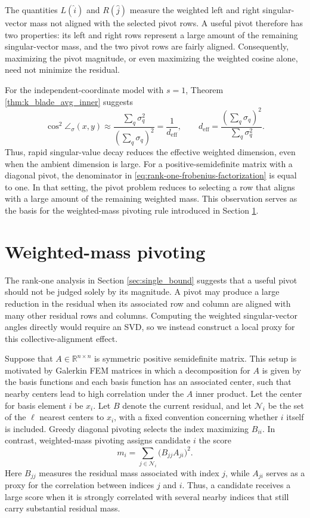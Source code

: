 \documentclass[11pt, preprint]{article}
\newcommand{\R}{\mathbb{R}}
\begin{document}
The quantities $L(\widehat i)$ and $R(\widehat j)$ measure the weighted
left and right singular-vector mass not aligned with the selected pivot
rows. A useful pivot therefore has two properties: its left and right rows
represent a large amount of the remaining singular-vector mass, and the two
pivot rows are fairly aligned. Consequently, maximizing
the pivot magnitude, or even maximizing the weighted cosine alone, need not
minimize the residual.

For the independent-coordinate model with $s=1$, Theorem
\ref{thm:k_blade_avg_inner} suggests
\[
\cos^2\angle_\sigma(x,y)
\approx
\frac{\sum_q\sigma_q^2}{\left(\sum_q\sigma_q\right)^2}
=
\frac{1}{d_{\mathrm{eff}}},
\qquad
d_{\mathrm{eff}}
=
\frac{\left(\sum_q\sigma_q\right)^2}{\sum_q\sigma_q^2}.
\]
Thus, rapid singular-value decay reduces the effective weighted dimension,
even when the ambient dimension is large. For a positive-semidefinite matrix
with a diagonal pivot, the denominator in
\eqref{eq:rank-one-frobenius-factorization} is equal to one. In that setting,
the pivot problem reduces to selecting a row that aligns with a large amount
of the remaining weighted mass. This observation serves as the basis for the 
weighted-mass pivoting rule introduced in Section
\ref{sec:weighted_mass_pivot}.


\section{Weighted-mass pivoting}\label{sec:weighted_mass_pivot}

The rank-one analysis in Section \ref{sec:single_bound} suggests that a useful
pivot should not be judged solely by its magnitude. A pivot may produce a
large reduction in the residual when its associated row and column are aligned
with many other residual rows and columns. Computing the weighted
singular-vector angles directly would require an SVD, so we instead construct
a local proxy for this collective-alignment effect.

Suppose that $A\in\R^{n\times n}$ is symmetric positive semidefinite matrix. This setup is motivated by Galerkin FEM matrices in which a decomposition for $A$ is given by the basis functions and each basis function has an associated center, such that nearby centers lead to high correlation under the $A$ inner product. Let the center for basis element $i$ be $x_i$. Let $B$ denote the
current residual, and let $\mathcal N_i$ be the set of the $\ell$ nearest centers
to $x_i$, with a fixed convention concerning whether $i$ itself is included.
Greedy diagonal pivoting selects the index maximizing $B_{ii}$. In contrast,
weighted-mass pivoting assigns candidate $i$ the score
\begin{equation}\label{eq:weighted-mass-score}
    m_i
    =
    \sum_{j\in\mathcal N_i}
    \bigl(B_{jj}A_{ji}\bigr)^2.
\end{equation}
Here $B_{jj}$ measures the residual mass associated with index $j$, while
$A_{ji}$ serves as a proxy for the correlation between indices $j$ and $i$.
Thus, a candidate receives a large score when it is strongly correlated with
several nearby indices that still carry substantial residual mass.
\end{document}
